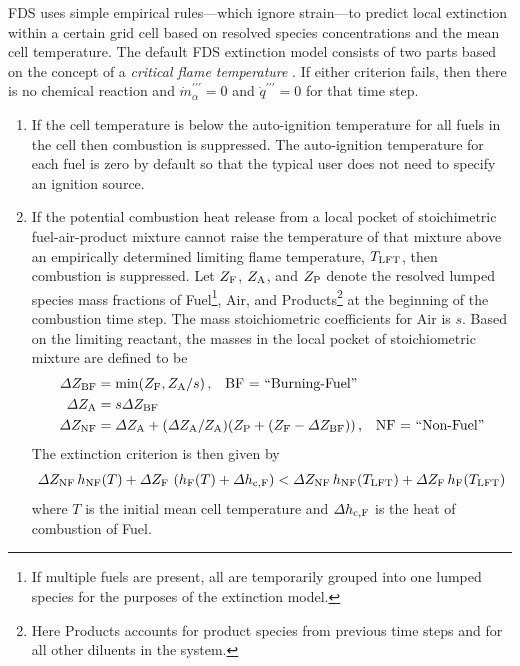 FDS uses simple empirical rules---which ignore strain---to predict local extinction within a certain grid cell based on resolved species concentrations and the mean cell temperature.  The default FDS extinction model consists of two parts based on the concept of a \emph{critical flame temperature} \cite{SFPE:Beyler}. If either criterion fails, then there is no chemical reaction and $\dot{m}_\alpha^{\prime\prime\prime}=0$ and $\dot{q}^{\prime\prime\prime}=0$ for that time step.

\begin{enumerate}
\item If the cell temperature is below the auto-ignition temperature for all fuels in the cell then combustion is suppressed. The auto-ignition temperature for each fuel is zero by default so that the typical user does not need to specify an ignition source.
\item If the potential combustion heat release from a local pocket of stoichimetric fuel-air-product mixture cannot raise the temperature of that mixture above an empirically determined limiting flame temperature, $T_{\rm LFT}$, then combustion is suppressed.  Let $Z_{\rm F}$, $Z_{\rm A}$, and $Z_{\rm P}$ denote the resolved lumped species mass fractions of Fuel\footnote{If multiple fuels are present, all are temporarily grouped into one lumped species for the purposes of the extinction model.}, Air, and Products\footnote{Here Products accounts for product species from previous time steps and for all other diluents in the system.} at the beginning of the combustion time step.  The mass stoichiometric coefficients for Air is $s$.  Based on the limiting reactant, the masses in the local pocket of stoichiometric mixture are defined to be
\begin{align}
\label{eq:dzf}  \Delta Z_{\rm BF} &= \min(Z_{\rm F},Z_{\rm A}/s)\,\mbox{,} \quad \mbox{BF = ``Burning-Fuel''}
                 \\
\label{eq:dza}  \Delta Z_{\rm A} &= s \Delta Z_{\rm BF}                           \\
\label{eq:dznf} \Delta Z_{\rm NF} &= \Delta Z_{\rm A} + (\Delta Z_{\rm A}/Z_{\rm A}) (Z_{\rm P}+(Z_{\rm F}-\Delta Z_{\rm BF}))\,\mbox{,} \quad \mbox{NF = ``Non-Fuel''}
\end{align}
The extinction criterion is then given by
\begin{equation}
\label{eq:extinction}
\Delta Z_{\rm NF} \, h_{\rm NF}(T) + \Delta Z_{\rm F}  \, \left( h_{\rm F}(T)+\Delta h_{\rm c,F} \right) <
\Delta Z_{\rm NF} \, h_{\rm NF}(T_{\rm LFT}) + \Delta Z_{\rm F}  \, h_{\rm F}(T_{\rm LFT})
\end{equation}
where $T$ is the initial mean cell temperature and $\Delta h_{\rm c,F}$ is the heat of combustion of Fuel.
\end{enumerate}

